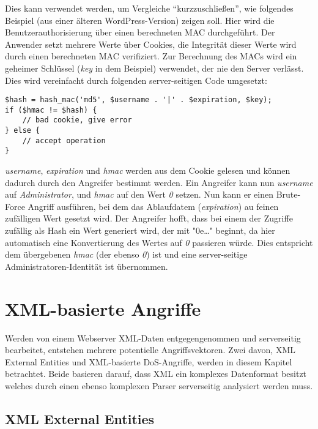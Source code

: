 Dies kann verwendet werden, um Vergleiche ``kurzzuschließen'', wie folgendes Beispiel (aus einer älteren WordPress-Version) zeigen soll. Hier wird die Benutzerauthorisierung über einen berechneten MAC durchgeführt. Der Anwender setzt mehrere Werte über Cookies, die Integrität dieser Werte wird durch einen berechneten MAC verifiziert. Zur Berechnung des MACs wird ein geheimer Schlüssel (\textit{key} in dem Beispiel) verwendet, der nie den Server verlässt. Dies wird vereinfacht durch folgenden server-seitigen Code umgesetzt:

\begin{listing}[H]
\begin{verbatim}
$hash = hash_mac('md5', $username . '|' . $expiration, $key);
if ($hmac != $hash) {
	// bad cookie, give error
} else {
	// accept operation
}
\end{verbatim}
\end{listing}

\textit{username}, \textit{expiration} und \textit{hmac} werden aus dem Cookie gelesen und können dadurch durch den Angreifer bestimmt werden. Ein Angreifer kann nun \textit{username} auf \textit{Administrator}, und \textit{hmac} auf den Wert \textit{0} setzen. Nun kann er einen Brute-Force Angriff ausführen, bei dem das Ablaufdatem (\textit{expiration}) au feinen zufälligen Wert gesetzt wird. Der Angreifer hofft, dass bei einem der Zugriffe zufällig als Hash ein Wert generiert wird, der mit "0e\ldots" beginnt, da hier automatisch eine Konvertierung des Wertes auf \textit{0} passieren würde. Dies entspricht dem übergebenen \textit{hmac} (der ebenso \textit{0}) ist und eine server-seitige Administratoren-Identität ist übernommen.

\section{XML-basierte Angriffe}

Werden von einem Webserver XML-Daten entgegengenommen und serverseitig bearbeitet, entstehen mehrere potentielle Angriffsvektoren. Zwei davon, XML External Entities und XML-basierte DoS-Angriffe, werden in diesem Kapitel betrachtet. Beide basieren darauf, dass XML ein komplexes Datenformat besitzt welches durch einen ebenso komplexen Parser serverseitig analysiert werden muss.

\subsection{XML External Entities}

